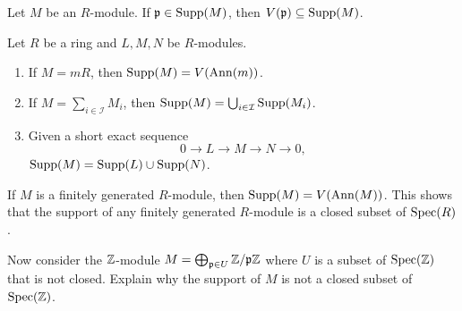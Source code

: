 \documentclass{ximera}
\begin{document}
\begin{exercise}
  Let $M$ be an $R$-module. If $\mathfrak{p}\in\operatorname{Supp}(M)$, then
  $V(\mathfrak{p})\subseteq\operatorname{Supp}(M)$.
\end{exercise}



\begin{proposition}%
  Let $R$ be a ring and $L,M,N$ be $R$-modules.
  \begin{enumerate}
  \item If $M = mR$, then $\operatorname{Supp}(M) = V(\operatorname{Ann}(m))$.
  \item If $M = \sum_{i\in \mathcal I} M_i$, then $\operatorname{Supp}(M) = \bigcup_{i\in \mathcal I} \operatorname{Supp}(M_i)$.
  \item Given a short exact sequence
    \[
    0 \to L \to M \to N \to 0,
    \]
    $\operatorname{Supp}(M) = \operatorname{Supp}(L) \cup \operatorname{Supp}(N)$.
  \end{enumerate}
\end{proposition}

\begin{exercise}
  If $M$ is a finitely generated $R$-module, then $\operatorname{Supp}(M) = V(\operatorname{Ann}(M))$.  This
  shows that the support of any finitely generated $R$-module is a
  closed subset of $\operatorname{Spec}(R)$.

  Now consider the $\mathbb Z$-module $M = \bigoplus_{\mathfrak{p}\in U} \mathbb Z/\mathfrak{p}\mathbb Z$ where $U$
  is a subset of $\operatorname{Spec}(\mathbb Z)$ that is not closed. Explain why the
  support of $M$ is not a closed subset of $\operatorname{Spec}(\mathbb Z)$.
\end{exercise}





\end{document}
